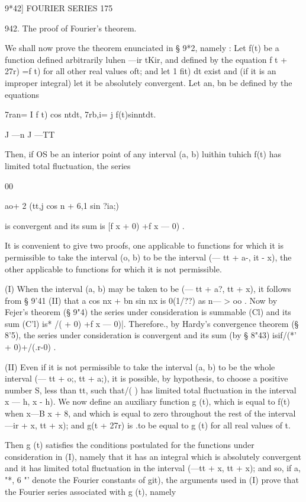 9*42] FOURIER SERIES 175

942. The proof of Fourier's theorem.

We shall now prove the theorem enunciated in § 9*2, namely : Let f(t)
be a function defined arbitrarily luhen —ir tKir, and defined by the
equation f t + 27r) =f t) for all other real values oft; and let 1
fit) dt exist and (if it is an improper integral) let it be absolutely
convergent. Let an, bn be defined by the equations

7ran= I f t) cos ntdt, 7rb,i= j f(t)sinntdt.

J —n J —TT

Then, if OS be an interior point of any interval (a, b) luithin tuhich
f(t) has limited total fluctuation, the series

00

 ao+ 2 (tt,j cos n + 6,1 sin ?ia;)

is convergent and its sum is [f x + 0) +f x — 0) .

It is convenient to give two proofs, one applicable to functions for
which it is permissible to take the interval (o, b) to be the interval
(— tt + a-, it - x), the other applicable to functions for which it is
not permissible.

(I) When the interval (a, b) may be taken to be (— tt + a?, tt + x),
it follows from § 9'41 (II) that a cos nx + bn sin nx is 0(1/??) as n—
> oo . Now by Fejer's theorem (§ 9"4) the series under consideration
is summable (Cl) and its sum (C'l) is* /( + 0) +f x — 0)|. Therefore.,
by Hardy's convergence theorem (§ 8'5), the series under consideration
is convergent and its sum (by § 8"43) isif/(*' + 0)+/(.r-0) .

(II) Even if it is not permissible to take the interval (a, b) to be
the whole interval (— tt + o;, tt + a;), it is possible, by
hypothesis, to choose a positive number S, less than tt, such that/( )
has limited total fluctuation in the interval x — h, x - h). We now
define an auxiliary function g (t), which is equal to f(t) when x—B%
x + 8, and which is equal to zero throughout the rest of the interval
—ir + x, tt + x); and g(t + 27r) is .to be equal to g (t) for all real
values of t.

Then g (t) satisfies the conditions postulated for the functions under
consideration in (I), namely that it has an integral which is
absolutely convergent and it has limited total fluctuation in the
interval (—tt + x, tt + x); and so, if a, "*, 6 "' denote the Fourier
constants of git), the arguments used in (I) prove that the Fourier
series associated with g (t), namely


